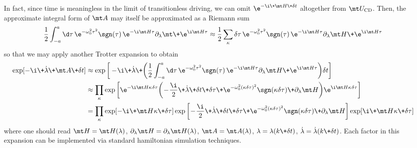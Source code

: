 In fact, since time is meaningless in the limit of transitionless driving, we can omit $\e^{-\i\+\mt H\+\delta t}$ altogether from $\mt U_{\rm CD}$. 
Then, the approximate integral form of $\mt A$ may itself be approximated as a Riemann sum
\begin{align}
    \frac12 \int_{-a}^a \d\tau \, \e^{-\omega_0^2\tau^2} \sgn(\tau) \, \e^{-\i \mt H \tau} \partial_\lambda \mt \+ \e^{\i \mt H \tau} \approx \frac12 \sum_\kappa \delta\tau \, \e^{-\omega_0^2\tau^2} \sgn(\tau) \, \e^{-\i \mt H \tau} \partial_\lambda \mt H \+ \e^{\i \mt H \tau}
\end{align}
so that we may apply another Trotter expansion to obtain
\begin{align}
\exp[-\i \+ \dot\lambda \+ \mt A \+ \delta t] &\approx \exp \bigg[ -\!\i \+ \dot\lambda \+ \bigg( \frac12 \int_{-a}^a \d\tau \, \e^{-\omega_0^2\tau^2} \sgn(\tau) \, \e^{-\i \mt H \tau} \partial_\lambda \mt H \+ \e^{\i \mt H \tau} \bigg) \delta t \bigg] \nonumber \\
&\approx \prod_\kappa \exp \bigg[ \e^{-\i\mt H \kappa \kern0.04em \delta\tau} \bigg( \! -\!\frac\i2 \+ \dot\lambda \+ \delta t \+ \delta\tau \+ \e^{-\omega_0^2(\kappa\delta\tau)^2} \sgn(\kappa\delta\tau) \+ \partial_\lambda\mt H \bigg) \e^{\i\mt H \kappa\kern0.04em \delta\tau} \bigg] \nonumber \\
&= \prod_\kappa \exp[-\i \+ \mt H \kern0.04em \kappa \+ \delta\tau] \exp \bigg[ \! -\!\frac\i2 \+ \dot\lambda \+ \delta t \+ \delta\tau \+ \e^{-\omega_0^2(\kappa\delta\tau)^2} \sgn(\kappa\delta\tau) \+ \partial_\lambda\mt H \bigg] \exp[\i \+ \mt H \kern0.04em \kappa \+ \delta\tau]
\end{align}
where one should read $\mt H = \mt H(\lambda)$, $\partial_\lambda\mt H = \partial_\lambda\mt H(\lambda)$, $\mt A = \mt A(\lambda)$, $\lambda = \lambda(k\+\delta t)$, $\dot\lambda = \dot\lambda(k\+\delta t)$. Each factor in this expansion can be implemented via standard hamiltonian simulation techniques.
